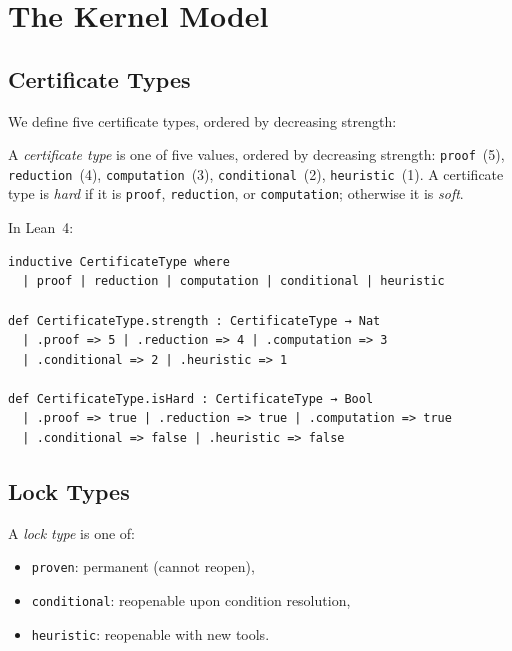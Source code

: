 \documentclass[runningheads]{llncs}
\begin{document}
\section{The Kernel Model}
\label{sec:model}

\subsection{Certificate Types}

We define five certificate types, ordered by decreasing strength:

\begin{definition}
\label{def:certtype}
A \emph{certificate type} is one of five values, ordered by
decreasing strength: \texttt{proof}~(5), \texttt{reduction}~(4),
\texttt{computation}~(3), \texttt{conditional}~(2),
\texttt{heuristic}~(1). A certificate type is \emph{hard} if it
is \texttt{proof}, \texttt{reduction}, or \texttt{computation};
otherwise it is \emph{soft}.
\end{definition}

\noindent
In Lean~4:

\begin{lstlisting}
inductive CertificateType where
  | proof | reduction | computation | conditional | heuristic

def CertificateType.strength : CertificateType → Nat
  | .proof => 5 | .reduction => 4 | .computation => 3
  | .conditional => 2 | .heuristic => 1

def CertificateType.isHard : CertificateType → Bool
  | .proof => true | .reduction => true | .computation => true
  | .conditional => false | .heuristic => false
\end{lstlisting}

\subsection{Lock Types}

\begin{definition}
\label{def:locktype}
A \emph{lock type} is one of:
\begin{itemize}
\item \texttt{proven}: permanent (cannot reopen),
\item \texttt{conditional}: reopenable upon condition resolution,
\item \texttt{heuristic}: reopenable with new tools.
\end{itemize}
\end{definition}
\end{document}
